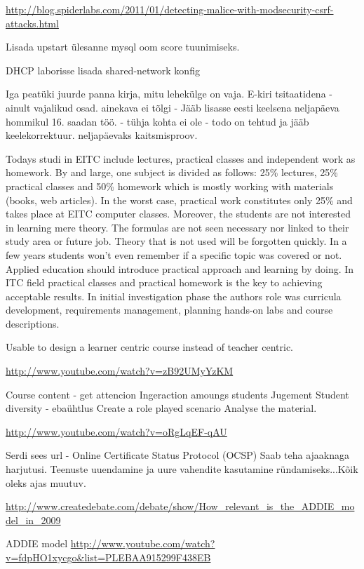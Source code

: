 \url{http://blog.spiderlabs.com/2011/01/detecting-malice-with-modsecurity-csrf-attacks.html}

Lisada upstart ülesanne mysql oom score tuunimiseks.


DHCP laborisse lisada shared-network konfig

Iga peatüki juurde panna kirja, mitu lehekülge on vaja.
E-kiri tsitaatidena - ainult vajalikud osad.
ainekava ei tõlgi - Jääb lisasse eesti keelsena
neljapäeva hommikul 16. saadan töö. - tühja kohta ei ole - todo on tehtud ja jääb keelekorrektuur.
neljapäevaks kaitsmisproov.

 Todays studi in \gls{EITC} include lectures, practical classes and independent work as homework. By and large, one subject is divided as follows: 25\% lectures, 25\% practical classes and 50\% homework which is mostly working with materials (books, web articles). In the worst case, practical work constitutes only 25\% and takes place at \gls{EITC} computer classes.
Moreover, the students are not interested in learning mere theory. The formulas are not seen necessary nor linked to their study area or future job. Theory that is not used will be forgotten quickly. In a few years students won't even remember if a specific topic was covered or not. Applied education should introduce practical approach and learning by doing. In ITC field practical classes and practical homework is the key to achieving acceptable results.
In initial investigation phase the authors role was curricula development, requirements management,  planning hands-on labs and course descriptions.

{\color{red} 
Usable to design a learner centric course instead of teacher centric. 

\url{http://www.youtube.com/watch?v=zB92UMyYzKM}

Course content - get attencion
Ingeraction amoungs students
Jugement 
Student diversity - ebaühtlus
Create a role played scenario
Analyse the material.

\url{http://www.youtube.com/watch?v=oRgLqEF-qAU}

}

Serdi sees url -  Online Certificate Status Protocol (OCSP)
Saab teha ajaaknaga harjutusi. Teenuste uuendamine ja uure vahendite kasutamine ründamiseks...Kõik oleks ajas muutuv.

\url{http://www.createdebate.com/debate/show/How_relevant_is_the_ADDIE_model_in_2009}

ADDIE model \url{http://www.youtube.com/watch?v=fdpHO1xycgo&list=PLEBAA915299F438EB}


